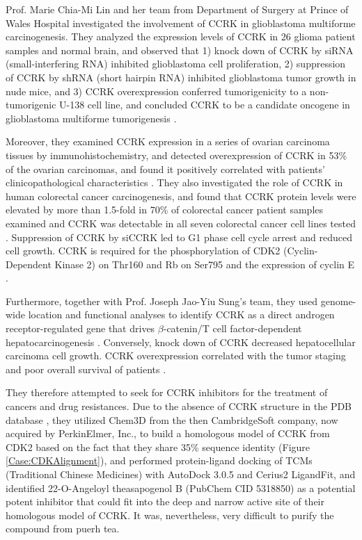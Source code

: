Prof. Marie Chia-Mi Lin and her team from Department of Surgery at Prince of Wales Hospital investigated the involvement of CCRK in glioblastoma multiforme carcinogenesis. They analyzed the expression levels of CCRK in 26 glioma patient samples and normal brain, and observed that 1) knock down of CCRK by siRNA (small-interfering RNA) inhibited glioblastoma cell proliferation, 2) suppression of CCRK by shRNA (short hairpin RNA) inhibited glioblastoma tumor growth in nude mice, and 3) CCRK overexpression conferred tumorigenicity to a non-tumorigenic U-138 cell line, and concluded CCRK to be a candidate oncogene in glioblastoma multiforme tumorigenesis \citep{1144}.

Moreover, they examined CCRK expression in a series of ovarian carcinoma tissues by immunohistochemistry, and detected overexpression of CCRK in 53\% of the ovarian carcinomas, and found it positively correlated with patients' clinicopathological characteristics \citep{1145}. They also investigated the role of CCRK in human colorectal cancer carcinogenesis, and found that CCRK protein levels were elevated by more than 1.5-fold in 70\% of colorectal cancer patient samples examined and CCRK was detectable in all seven colorectal cancer cell lines tested \citep{1143}. Suppression of CCRK by siCCRK led to G1 phase cell cycle arrest and reduced cell growth. CCRK is required for the phosphorylation of CDK2 (Cyclin-Dependent Kinase 2) on Thr160 and Rb on Ser795 and the expression of cyclin E \citep{1143}. 

Furthermore, together with Prof. Joseph Jao-Yiu Sung's team, they used genome-wide location and functional analyses to identify CCRK as a direct androgen receptor-regulated gene that drives $\beta$-catenin/T cell factor-dependent hepatocarcinogenesis \citep{1146}. Conversely, knock down of CCRK decreased hepatocellular carcinoma cell growth. CCRK overexpression correlated with the tumor staging and poor overall survival of patients \citep{1146}.

They therefore attempted to seek for CCRK inhibitors for the treatment of cancers and drug resistances. Due to the absence of CCRK structure in the PDB database \citep{540,537}, they utilized Chem3D from the then CambridgeSoft company, now acquired by PerkinElmer, Inc., to build a homologous model of CCRK from CDK2 based on the fact that they share 35\% sequence identity (Figure \ref{Case:CDKAlignment}), and performed protein-ligand docking of TCMs (Traditional Chinese Medicines) with AutoDock 3.0.5 and Cerius2 LigandFit, and identified 22-O-Angeloyl theasapogenol B (PubChem CID 5318850) as a potential potent inhibitor that could fit into the deep and narrow active site of their homologous model of CCRK. It was, nevertheless, very difficult to purify the compound from puerh tea.

